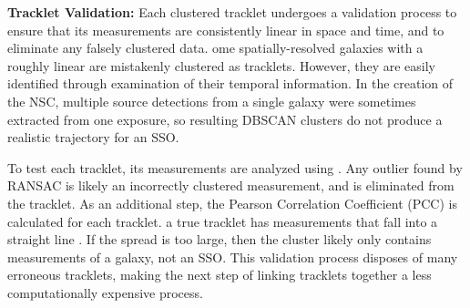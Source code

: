 \documentclass[twocolumn]{aastex62}
\begin{document}
{\bf Tracklet Validation:} Each clustered tracklet undergoes a validation process to ensure that its measurements are consistently linear in space and time, and to eliminate any falsely clustered data.  ome spatially-resolved galaxies  with a roughly linear  are mistakenly clustered as tracklets.  However, they are easily identified through examination of their temporal information.  In the creation of the NSC, multiple source detections from a single galaxy were sometimes extracted from one exposure, so resulting DBSCAN clusters do not produce a realistic trajectory for an SSO.

To test each tracklet, its measurements are analyzed using   .   Any outlier found by RANSAC is likely an incorrectly clustered measurement, and is eliminated from the tracklet.  As an additional step, the Pearson Correlation Coefficient (PCC) is calculated for each tracklet.   a true tracklet has measurements that fall into a straight line .  If the spread  is too large, then the cluster likely only contains measurements of a galaxy, not an SSO.  This validation process disposes of many erroneous tracklets, making the next step of linking tracklets together a less computationally expensive process.
\end{document}
